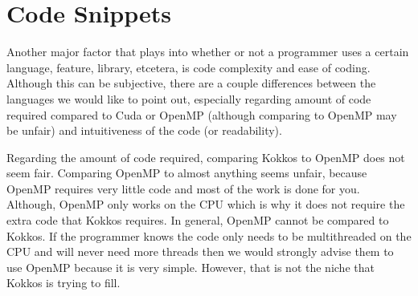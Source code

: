 \section{Code Snippets}
Another major factor that plays into whether or not a programmer uses a certain
language, feature, library, etcetera, is code complexity and ease of coding.
Although this can be subjective, there are a couple differences between the
languages we would like to point out, especially regarding amount of code
required compared to Cuda or OpenMP (although comparing to OpenMP may be unfair)
and intuitiveness of the code (or readability). 

Regarding the amount of code required, comparing Kokkos to OpenMP does not seem
fair. Comparing OpenMP to almost anything seems unfair, because OpenMP requires
very little code and most of the work is done for you. Although, OpenMP only
works on the CPU which is why it does not require the extra code that Kokkos
requires. In general, OpenMP cannot be compared to Kokkos. If the programmer
knows the code only needs to be multithreaded on the CPU and will never need
more threads then we would strongly advise them to use OpenMP because it is very
simple. However, that is not the niche that Kokkos is trying to fill. 

